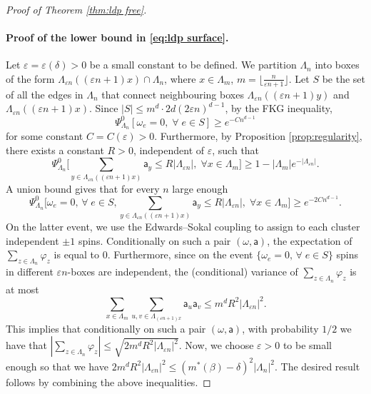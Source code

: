 \documentclass[11pt,a4paper]{article}
\renewcommand{\epsilon}{\varepsilon}
\theoremstyle{definition}
\numberwithin{equation}{section}
\begin{document}
\begin{proof}[Proof of Theorem \textup{\ref{thm:ldp free}}]
\paragraph{Proof of the lower bound in \eqref{eq:ldp surface}.} Let $\varepsilon=\varepsilon(\delta)>0$ be a small constant to be defined. We partition $\Lambda_n$ into boxes of the form $\Lambda_{\varepsilon n}((\varepsilon n +1)x)\cap \Lambda_n$, where $x\in \Lambda_m$, $m=\lfloor\frac{n}{\varepsilon n+1}\rfloor$. Let $S$ be the set of all the edges in $\Lambda_n$ that connect neighbouring boxes $\Lambda_{\varepsilon n}((\varepsilon n +1)y)$ and $\Lambda_{\varepsilon n}((\varepsilon n +1)x)$. Since $|S|\leq m^d \cdot 2d (2\varepsilon n)^{d-1}$, by the FKG inequality,
\begin{equation}
\Psi^0_{\Lambda_n}[\omega_e=0 ,\; \forall \; e\in S]\geq e^{-Cn^{d-1}}
\end{equation}
for some constant $C=C(\varepsilon)>0$. Furthermore, by Proposition \ref{prop:regularity}, there exists a constant $R>0$, independent of $\varepsilon$, such that 
\begin{equation}
\Psi^0_{\Lambda_n}\Big[\sum_{y\in \Lambda_{\varepsilon n}((\varepsilon n+1)x)} \mathsf{a}_y\leq R|\Lambda_{\varepsilon n}| ,\; \forall x\in \Lambda_m\Big]\geq 1- |\Lambda_m| e^{-|\Lambda_{\varepsilon n}|}.
\end{equation}
A union bound gives that for every $n$ large enough
\begin{equation}
\Psi^0_{\Lambda_n}\Big[\omega_e=0 ,\, \forall \; e\in S, \sum_{y\in \Lambda_{\varepsilon n}((\varepsilon n+1)x)} \mathsf{a}_y\leq R|\Lambda_{\varepsilon n}| ,\; \forall x\in \Lambda_m\Big]\geq e^{-2Cn^{d-1}}.
\end{equation}
On the latter event, we use the Edwards--Sokal coupling to assign to each cluster independent $\pm 1$ spins. Conditionally on such a pair $(\omega,\mathsf{a})$, the expectation of $\sum_{z\in \Lambda_n} \varphi_z$ is equal to $0$. Furthermore, since on the event $\{\omega_e=0 ,\, \forall \; e\in S\}$ spins in different $\varepsilon n$-boxes are independent, the (conditional) variance of $\sum_{z\in \Lambda_n} \varphi_z$ is at most
\begin{equation}
\sum_{x\in \Lambda_m} \sum_{u,v\in \Lambda_{(\varepsilon n+1)x}} \mathsf{a}_u \mathsf{a}_v\leq m^d R^2 |\Lambda_{\epsilon n}|^2.
\end{equation}
This implies that conditionally on such a pair $(\omega,\mathsf{a})$, with probability $1/2$ we have that $|\sum_{z\in \Lambda_n} \varphi_z|\leq \sqrt{2 m^d R^2 |\Lambda_{\epsilon n}|^2}$. Now, we choose $\varepsilon>0$ to be small enough so that we have $2 m^d R^2 |\Lambda_{\epsilon n}|^2\leq (m^*(\beta)-\delta)^2 |\Lambda_n|^2$. The desired result follows by combining the above inequalities.
\end{proof}
\end{document}
